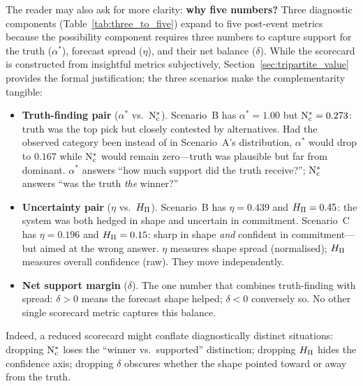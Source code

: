 The reader may also ask for more clarity:
\textbf{why five numbers?} Three diagnostic components
(Table~\ref{tab:three_to_five}) expand to five post-event metrics
because the possibility component requires three numbers to capture
support for the truth ($\alpha^*$), forecast spread ($\eta$), and their
net balance ($\delta$).
While the scorecard is constructed from insightful
metrics subjectively,
Section~\ref{sec:tripartite_value} provides the
formal justification;
the three scenarios make the complementarity
tangible:
\begin{itemize}[leftmargin=2em]
\item \textbf{Truth-finding pair} ($\alpha^*$ vs.\ $\mathrm{N}_{\mathrm{c}}^*$).
    Scenario~B has $\alpha^* = 1.00$ but $\mathrm{N}_{\mathrm{c}}^* = 0.273$: truth was the
    top pick but closely contested by alternatives. Had the observed
    category been  instead of  in Scenario~A's
    distribution, $\alpha^*$ would drop to $0.167$ while $\mathrm{N}_{\mathrm{c}}^*$ would
    remain zero---truth was plausible but far from dominant.
    $\alpha^*$ answers ``how much support did the truth receive?'';
    $\mathrm{N}_{\mathrm{c}}^*$ answers ``was the truth \textit{the} winner?''
\item \textbf{Uncertainty pair} ($\eta$ vs.\ $H_{\Pi}$).
    Scenario~B has $\eta = 0.439$ and $H_{\Pi} = 0.45$: the system was both
    hedged in shape and uncertain in commitment. Scenario~C has
    $\eta = 0.196$ and $H_{\Pi} = 0.15$: sharp in shape \textit{and}
    confident in commitment---but aimed at the wrong answer.
    $\eta$ measures shape spread (normalised); $H_{\Pi}$ measures overall
    confidence (raw). They move independently.
\item \textbf{Net support margin} ($\delta$).
    The one number that combines truth-finding with spread: $\delta > 0$
    means the forecast shape helped; $\delta < 0$ conversely so.
    No other single scorecard metric captures this balance.
\end{itemize}

Indeed, a reduced scorecard might conflate diagnostically distinct situations:
dropping $\mathrm{N}_{\mathrm{c}}^*$ loses the ``winner vs.\ supported'' distinction;
dropping $H_{\Pi}$ hides the confidence axis; dropping $\delta$ obscures
whether the shape pointed toward or away from the truth.
